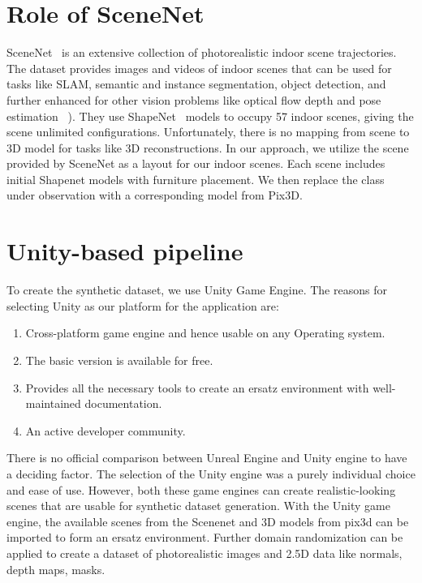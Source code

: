 \section{Role of SceneNet}\label{sec:role-of-scenenet}
SceneNet~\cite{McCormac:etal:ICCV2017} is an extensive collection of photorealistic indoor scene trajectories.
The dataset provides images and videos of indoor scenes that can be used for tasks like SLAM,
semantic and instance segmentation, object detection, and further enhanced for other vision problems like optical flow depth and pose estimation ~\cite{McCormac:etal:ICCV2017}).
They use ShapeNet~\cite{chang2015shapenet} models to occupy 57 indoor scenes, giving the scene unlimited configurations.
Unfortunately, there is no mapping from scene to 3D model for tasks like 3D reconstructions.
In our approach, we utilize the scene provided by SceneNet as a layout for our indoor scenes.
Each scene includes initial Shapenet models with furniture placement.
We then replace the class under observation with a corresponding model from Pix3D.

\section{Unity-based pipeline}\label{sec:unity-based-pipeline}
To create the synthetic dataset, we use Unity Game Engine.
The reasons for selecting Unity as our platform for the application are:
\begin{enumerate}
    \item Cross-platform game engine and hence usable on any Operating system.
    \item The basic version is available for free.
    \item Provides all the necessary tools to create an ersatz environment with well-maintained documentation.
    \item An active developer community.
\end{enumerate}

There is no official comparison between Unreal Engine and Unity engine to have a deciding factor.
The selection of the Unity engine was a purely individual choice and ease of use.
However, both these game engines can create realistic-looking scenes that are usable for synthetic dataset generation.
With the Unity game engine, the available scenes from the Scenenet and 3D models from pix3d can be imported to form an ersatz environment.
Further domain randomization can be applied to create a dataset of photorealistic images and 2.5D data like normals, depth maps, masks.

